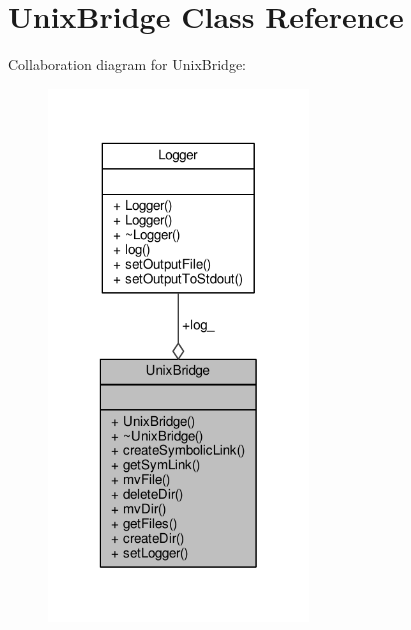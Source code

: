 \hypertarget{classUnixBridge}{\section{Unix\-Bridge Class Reference}
\label{classUnixBridge}
}


Collaboration diagram for Unix\-Bridge\-:
\nopagebreak
\begin{figure}[H]
\begin{center}
\leavevmode
\includegraphics[width=196pt]{classUnixBridge__coll__graph}
\end{center}
\end{figure}
